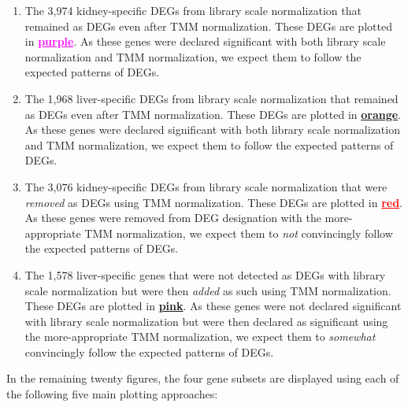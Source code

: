 \documentclass[11pt,a4paper,oldfontcommands,openany]{memoir}
\numberwithin{equation}{section} %
\begin{document}
\begin{enumerate}

\item The 3,974 kidney-specific DEGs from library scale normalization that remained as DEGs even after TMM normalization. These DEGs are plotted in \textbf{\textcolor{Fuchsia}{\underline{purple}}}. As these genes were declared significant with both library scale normalization and TMM normalization, we expect them to follow the expected patterns of DEGs.

\item The 1,968 liver-specific DEGs from library scale normalization that remained as DEGs even after TMM normalization. These DEGs are plotted in \textbf{\textcolor{Bittersweet}{\underline{orange}}}. As these genes were declared significant with both library scale normalization and TMM normalization, we expect them to follow the expected patterns of DEGs.

\item The 3,076 kidney-specific DEGs from library scale normalization that were \textit{removed} as DEGs using TMM normalization. These DEGs are plotted in \textbf{\textcolor{Red}{\underline{red}}}. As these genes were removed from DEG designation with the more-appropriate TMM normalization, we expect them to \textit{not} convincingly follow the expected patterns of DEGs.

\item The 1,578 liver-specific genes that were not detected as DEGs with library scale normalization but were then \textit{added} as such using TMM normalization. These DEGs are plotted in \textbf{\textcolor{RubineRed}{\underline{pink}}}. As these genes were not declared significant with library scale normalization but were then declared as significant using the more-appropriate TMM normalization, we expect them to \textit{somewhat} convincingly follow the expected patterns of DEGs.

\end{enumerate}

\noindent
In the remaining twenty figures, the four gene subsets are displayed using each of the following five main plotting approaches:
\end{document}
